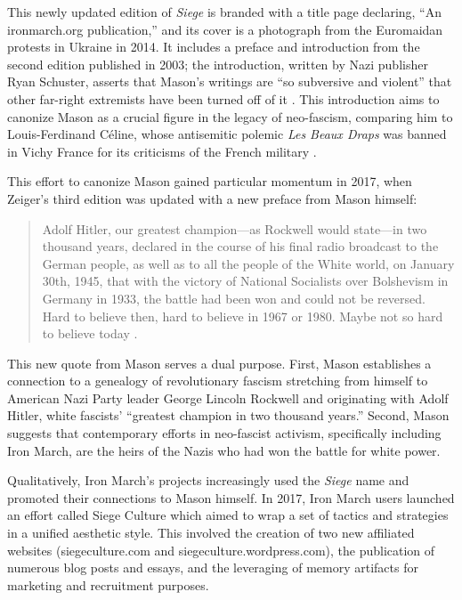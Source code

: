 \documentclass[bibtex,autowc,nonblind]{apsr_submission}
\begin{document}
This newly updated edition of \textit{Siege} is branded with a title page declaring, ``An ironmarch.org publication,'' and its cover is a photograph from the Euromaidan protests in Ukraine in 2014. It includes a preface and introduction from the second edition published in 2003; the introduction, written by Nazi publisher Ryan Schuster, asserts that Mason's writings are ``so subversive and violent'' that other far-right extremists have been turned off of it \citep{siege2015}. This introduction aims to canonize Mason as a crucial figure in the legacy of neo-fascism, comparing him to Louis-Ferdinand C\'eline, whose antisemitic polemic \textit{Les Beaux Draps} was banned in Vichy France for its criticisms of the French military \citep{maftei2011ecriture}.

This effort to canonize Mason gained particular momentum in 2017, when Zeiger's third edition was updated with a new preface from Mason himself:

\begin{quote}
    Adolf Hitler, our greatest champion---as Rockwell would state---in two thousand years, declared in the course of his final radio broadcast to the German people, as well as to all the people of the White world, on January 30th, 1945, that with the victory of National Socialists over Bolshevism in Germany in 1933, the battle had been won and could not be reversed. Hard to believe then, hard to believe in 1967 or 1980. Maybe not so hard to believe today \citep{siege2017}.
\end{quote}

This new quote from Mason serves a dual purpose. First, Mason establishes a connection to a genealogy of revolutionary fascism stretching from himself to American Nazi Party leader George Lincoln Rockwell and originating with Adolf Hitler, white fascists' ``greatest champion in two thousand years.'' Second, Mason suggests that contemporary efforts in neo-fascist activism, specifically including Iron March, are the heirs of the Nazis who had won the battle for white power.

Qualitatively, Iron March's projects increasingly used the \textit{Siege} name and promoted their connections to Mason himself. In 2017, Iron March users launched an effort called Siege Culture which aimed to wrap a set of tactics and strategies in a unified aesthetic style. This involved the creation of two new affiliated websites (siegeculture.com and siegeculture.wordpress.com), the publication of numerous blog posts and essays, and the leveraging of memory artifacts for marketing and recruitment purposes.
\end{document}
